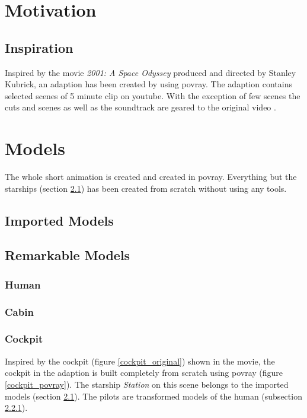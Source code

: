 
\chapter{Motivation}
\section{Inspiration}
Inspired by the movie \textit{2001: A Space Odyssey} produced and directed by Stanley Kubrick, an adaption has been created by using povray. The adaption contains selected scenes of 5 minute clip on youtube.  With the exception of few scenes the cuts and scenes as well as the soundtrack are geared to the original video  \cite{EbClectic}.

\chapter{Models}
The whole short animation is created and created in povray. Everything but the starships (section \ref{imported_models}) has been created from scratch without using any tools.

\section{Imported Models} \label{imported_models}
\section{Remarkable Models}
\subsection{Human} \label{human_model}
\subsection{Cabin} 
\newpage
\subsection{Cockpit} \label{cockpit_model}
Inspired by the cockpit (figure \ref{cockpit_original}) shown in the movie, the cockpit in the adaption  is built completely from scratch using povray (figure \ref{cockpit_povray}). The starship \textit{Station} on this scene belongs to the imported models (section \ref{imported_models}). 
The pilots are transformed models of the human (subsection \ref{human_model}). 

